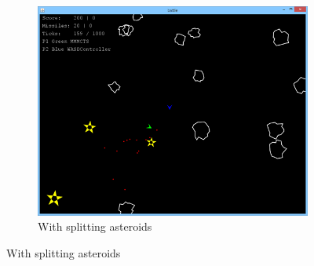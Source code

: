 \begin{figure}
\begin{subfigure}[b]{0.3\textwidth}
		\includegraphics[scale=0.33]{resources/gamemode0}
		\caption{With splitting asteroids}
	\end{subfigure}
\end{figure}
	